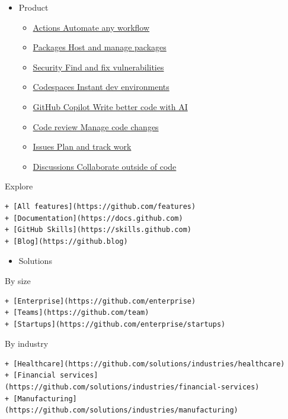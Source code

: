 \documentclass[
  letterpaper,
]{book}
\providecommand{\tightlist}{%
  \setlength{\itemsep}{0pt}\setlength{\parskip}{0pt}}\usepackage{longtable,booktabs,array}
\begin{document}
\begin{itemize}
\item
  Product

  \begin{itemize}
  \tightlist
  \item
    \href{https://github.com/features/actions}{Actions Automate any
    workflow}
  \item
    \href{https://github.com/features/packages}{Packages Host and manage
    packages}
  \item
    \href{https://github.com/features/security}{Security Find and fix
    vulnerabilities}
  \item
    \href{https://github.com/features/codespaces}{Codespaces Instant dev
    environments}
  \item
    \href{https://github.com/features/copilot}{GitHub Copilot Write
    better code with AI}
  \item
    \href{https://github.com/features/code-review}{Code review Manage
    code changes}
  \item
    \href{https://github.com/features/issues}{Issues Plan and track
    work}
  \item
    \href{https://github.com/features/discussions}{Discussions
    Collaborate outside of code}
  \end{itemize}
\end{itemize}

Explore

\begin{verbatim}
+ [All features](https://github.com/features)
+ [Documentation](https://docs.github.com)
+ [GitHub Skills](https://skills.github.com)
+ [Blog](https://github.blog)
\end{verbatim}

\begin{itemize}
\tightlist
\item
  Solutions
\end{itemize}

By size

\begin{verbatim}
+ [Enterprise](https://github.com/enterprise)
+ [Teams](https://github.com/team)
+ [Startups](https://github.com/enterprise/startups)
\end{verbatim}

By industry

\begin{verbatim}
+ [Healthcare](https://github.com/solutions/industries/healthcare)
+ [Financial services](https://github.com/solutions/industries/financial-services)
+ [Manufacturing](https://github.com/solutions/industries/manufacturing)
\end{verbatim}
\end{document}

